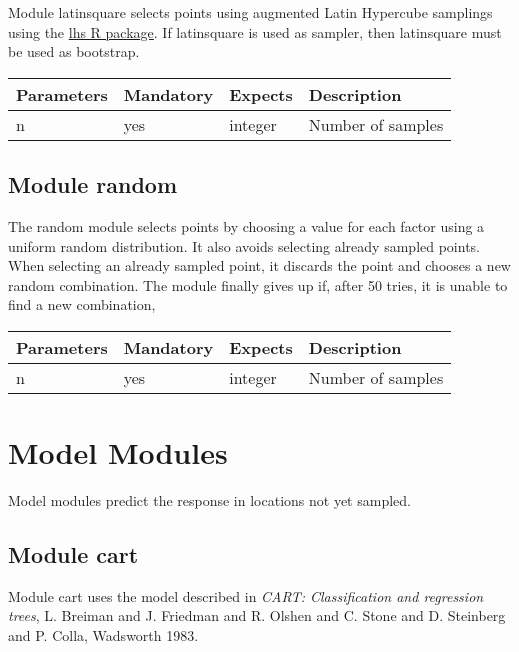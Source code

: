 Module latinsquare selects points using augmented Latin Hypercube samplings using the \href{http://cran.r-project.org/web/packages/lhs/}{lhs R package}.
If latinsquare is used as sampler, then latinsquare must be used as bootstrap.

	\vspace{0.5cm}\begin{tabular}{| p{} | p{} | p{} | p{}  |}
		\hline
		\textbf{ Parameters} & \textbf{ Mandatory} & \textbf{ Expects} & \textbf{ Description} \\ \hline
		 n &  yes &  integer &  Number of samples \\ \hline
	\end{tabular}

\subsection{Module random}

The random module selects points by choosing a value for each factor using a uniform random distribution. 
It also avoids selecting already sampled points.
When selecting an already sampled point, it discards the point and chooses a new random combination. 
The module finally gives up if, after 50 tries, it is unable to find a new combination, 

	\vspace{0.5cm}\begin{tabular}{| p{} | p{} | p{} | p{}  |}
		\hline
		\textbf{ Parameters} & \textbf{ Mandatory} & \textbf{ Expects} & \textbf{ Description} \\ \hline
		 n &  yes &  integer &  Number of samples \\ \hline
	\end{tabular}

\section{Model Modules}

Model modules predict the response in locations not yet sampled.

\subsection{Module cart}

Module cart uses the model described in \emph{CART: Classification and regression trees}, L. Breiman and J. Friedman and R. Olshen and C. Stone and D. Steinberg and P. Colla, Wadsworth 1983.

